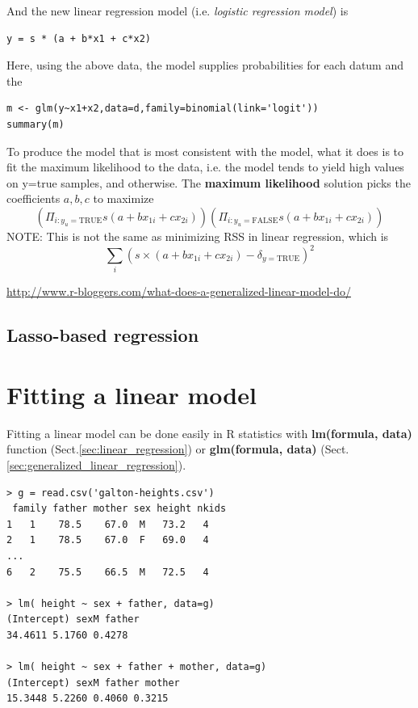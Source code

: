And the new linear regression model (i.e. {\it logistic regression model}) is 
\begin{verbatim}
y = s * (a + b*x1 + c*x2) 
\end{verbatim}
Here, using the above data, the model supplies probabilities for each datum and
the 
\begin{verbatim}
m <- glm(y~x1+x2,data=d,family=binomial(link='logit'))
summary(m)
\end{verbatim}

To produce the model that is most consistent with the model, what it does is to
fit the maximum likelihood to the data, i.e. the model tends to yield  high
values on y=true samples, and otherwise. The {\bf maximum likelihood} solution
picks the coefficients $a,b,c$ to maximize
\begin{equation}
\left( \Pi_{i:y_u=\text{TRUE}} s(a+bx_{1i} + cx_{2i})\right)
\left( \Pi_{i:y_u=\text{FALSE}} s(a+bx_{1i} + cx_{2i})\right)
\end{equation}
NOTE: This is not the same as minimizing RSS in linear regression,
which is 
\begin{equation}
\sum_i \left( s \times (a+bx_{1i}+cx_{2i}) -\delta_{y=\text{TRUE}} \right)^2
\end{equation}

\url{http://www.r-bloggers.com/what-does-a-generalized-linear-model-do/}

\subsection{Lasso-based regression}
\label{sec:Lasso-regression}




\section{Fitting a linear model}
\label{sec:fitting-linear-model}


Fitting a linear model can be done easily in R statistics with {\bf
  lm(formula, data)} function (Sect.\ref{sec:linear_regression}) or {\bf
  glm(formula, data)} (Sect.\ref{sec:generalized_linear_regression}).

\begin{lstlisting}
> g = read.csv('galton-heights.csv')
 family father mother sex height nkids
1   1    78.5    67.0  M   73.2   4
2   1    78.5    67.0  F   69.0   4 
...
6   2    75.5    66.5  M   72.5   4

> lm( height ~ sex + father, data=g)
(Intercept) sexM father
34.4611 5.1760 0.4278

> lm( height ~ sex + father + mother, data=g)
(Intercept) sexM father mother
15.3448 5.2260 0.4060 0.3215
\end{lstlisting}

